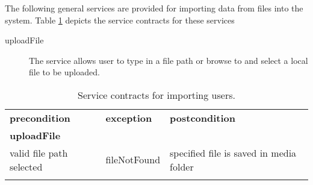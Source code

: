 The following general services are provided for importing data from files into the system. Table \ref{tab:gerealImportContracts} depicts the service contracts for these services 

\begin{description}
\item[uploadFile] The service allows user to type in a file path or browse to and select a local file to be uploaded.
\end{description}


\begin{table}[htb]
\caption{Service contracts for importing users.
\label{tab:gerealImportContracts}}
\begin{tabular}{l l l}
\hline
\noalign{\smallskip}
\textbf{precondition}&\textbf{exception} &\textbf{postcondition}\\
\noalign{\smallskip}
\hline
\textbf{uploadFile}\\
valid file path selected & fileNotFound & specified file is saved in media folder\\
\noalign{\smallskip}
\hline
\end{tabular}  
\end{table}


